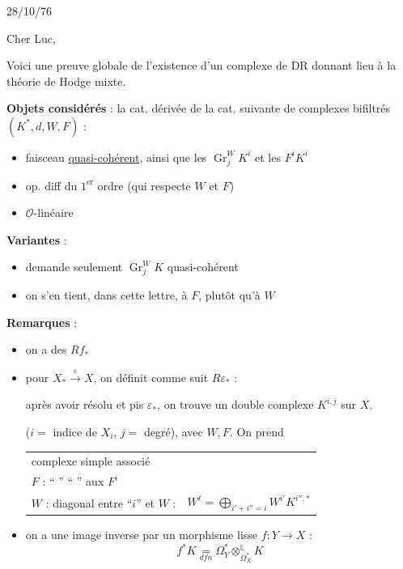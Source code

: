 \documentclass[11pt,a4paper]{article}
\DeclareMathOperator{\Gr}{Gr}
\begin{document}
\begin{flushright}
28/10/76
\end{flushright}

\vspace{0.5cm}

\noindent Cher Luc,

\vspace{0.5cm}

Voici une preuve globale de l'existence d'un complexe de DR donnant lieu \`a la th\'eorie de Hodge mixte.

\vspace{0.3cm}

\noindent \textbf{Objets consid\'er\'es} : la cat. d\'eriv\'ee de la cat. suivante de complexes bifiltr\'es $(K^{*}, d, W, F)$ :
\begin{itemize}[leftmargin=2cm]
    \item[$K^{i}$ :] faisceau \underline{quasi-coh\'erent}, ainsi que les $\Gr_{j}^{W} K^{i}$ et les $F^{i} K^{i}$
    \item[$d$ :] op. diff du $1^{\text{er}}$ ordre (qui respecte $W$ et $F$)
    \item[$\Gr_{j}(d)$ :] $\mathcal{O}$-lin\'eaire
\end{itemize}

\vspace{0.3cm}

\noindent \textbf{Variantes} :
\begin{itemize}[leftmargin=2cm]
    \item[a)] demande seulement $\Gr_{j}^{W} K$ quasi-coh\'erent
    \item[b)] on s'en tient, dans cette lettre, \`a $F$, plut\^ot qu'\`a $W$
\end{itemize}

\vspace{0.3cm}

\noindent \textbf{Remarques} :
\begin{itemize}[leftmargin=2cm]
    \item[a)] on a des $Rf_{*}$
    \item[b)] pour $X_{*} \xrightarrow{\varepsilon} X$, on d\'efinit comme suit $R\varepsilon_{*}$ :
    
    apr\`es avoir r\'esolu et pis $\varepsilon_{*}$, on trouve un double complexe $K^{i,j}$ sur $X$.
    
    ($i =$ indice de $X_{i}$, $j =$ degr\'e), avec $W, F$. On prend
    \begin{center}
    \begin{tabular}{ll}
    complexe simple associ\'e & \\
    $F$ : `` '' `` '' aux $F^{i}$ & \\
    $W$ : diagonal entre ``$i$'' et $W$ : & $W^{\ell} = \bigoplus\limits_{i'+i''=i} W^{i'} K^{i'',*}$
    \end{tabular}
    \end{center}
    \item[c)] on a une image inverse par un morphisme lisse $f : Y \to X$ :
    \[
    f^{*} K \underset{dfn}{=} \Omega_{Y}^{*} \otimes_{\Omega_{X}^{*}}^{\mathbb{L}} K
    \]
\end{itemize}
\end{document}
